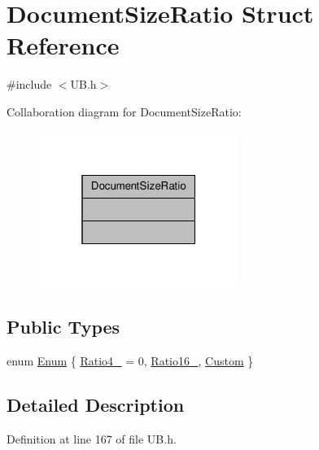 \hypertarget{struct_document_size_ratio}{\section{Document\-Size\-Ratio Struct Reference}
\label{d5/d35/struct_document_size_ratio}
}


{\ttfamily \#include $<$U\-B.\-h$>$}



Collaboration diagram for Document\-Size\-Ratio\-:
\nopagebreak
\begin{figure}[H]
\begin{center}
\leavevmode
\includegraphics[width=184pt]{d1/d91/struct_document_size_ratio__coll__graph}
\end{center}
\end{figure}
\subsection*{Public Types}
\begin{DoxyCompactItemize}
\item 
enum \hyperlink{struct_document_size_ratio_a5a7547375e6ea65421c7cbe46b2aed8a}{Enum} \{ \hyperlink{struct_document_size_ratio_a5a7547375e6ea65421c7cbe46b2aed8aa51eb5a722c07e48b7ab668c5fa3f5105}{Ratio4\-\_} =  0, 
\hyperlink{struct_document_size_ratio_a5a7547375e6ea65421c7cbe46b2aed8aaeec4d492a00d52b14dc46a7f76e6541f}{Ratio16\-\_}, 
\hyperlink{struct_document_size_ratio_a5a7547375e6ea65421c7cbe46b2aed8aaad37927ef998831523d3126bd03b029f}{Custom}
 \}
\end{DoxyCompactItemize}


\subsection{Detailed Description}


Definition at line 167 of file U\-B.\-h.



